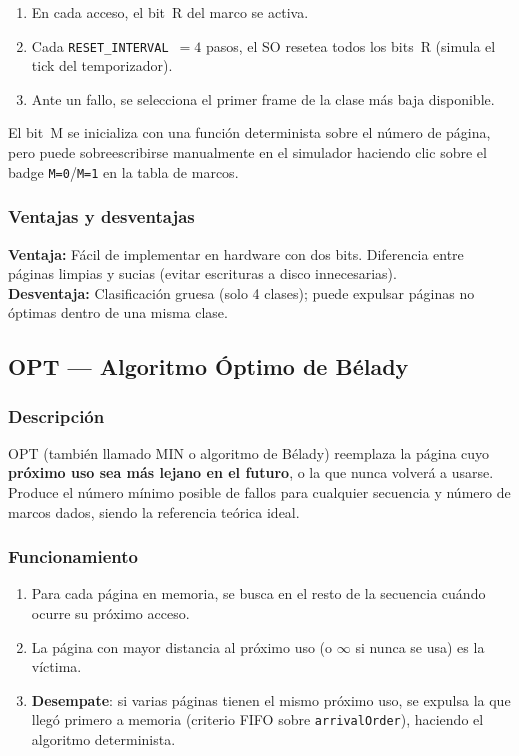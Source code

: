 \documentclass[12pt, a4paper]{article}
\begin{document}
\begin{enumerate}
  \item En cada acceso, el bit~R del marco se activa.
  \item Cada \texttt{RESET\_INTERVAL}~$= 4$ pasos, el SO resetea todos los bits~R (simula el tick del temporizador).
  \item Ante un fallo, se selecciona el primer frame de la clase más baja disponible.
\end{enumerate}

El bit~M se inicializa con una función determinista sobre el número de página, pero puede sobreescribirse manualmente en el simulador haciendo clic sobre el badge \texttt{M=0}/\texttt{M=1} en la tabla de marcos.

\subsubsection{Ventajas y desventajas}

\begin{infobox}[title={NRU}]
\textbf{Ventaja:} Fácil de implementar en hardware con dos bits. Diferencia entre páginas limpias y sucias (evitar escrituras a disco innecesarias). \\
\textbf{Desventaja:} Clasificación gruesa (solo 4 clases); puede expulsar páginas no óptimas dentro de una misma clase.
\end{infobox}

\subsection{OPT — Algoritmo Óptimo de Bélady}

\subsubsection{Descripción}

OPT (también llamado MIN o algoritmo de Bélady) reemplaza la página cuyo \textbf{próximo uso sea más lejano en el futuro}, o la que nunca volverá a usarse. Produce el número mínimo posible de fallos para cualquier secuencia y número de marcos dados, siendo la referencia teórica ideal.

\subsubsection{Funcionamiento}

\begin{enumerate}
  \item Para cada página en memoria, se busca en el resto de la secuencia cuándo ocurre su próximo acceso.
  \item La página con mayor distancia al próximo uso (o \(\infty\) si nunca se usa) es la víctima.
  \item \textbf{Desempate}: si varias páginas tienen el mismo próximo uso, se expulsa la que llegó primero a memoria (criterio FIFO sobre \texttt{arrivalOrder}), haciendo el algoritmo determinista.
\end{enumerate}
\end{document}
